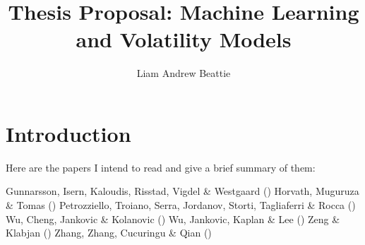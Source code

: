 \documentclass[11pt,preprint]{elsarticle}
\numberwithin{equation}{section}
\numberwithin{figure}{section}
\numberwithin{table}{section}
\begin{document}
\begin{frontmatter}  %

\title{Thesis Proposal: Machine Learning and Volatility Models}





\author[Add1]{Liam Andrew Beattie}





\address[Add1]{Stellenbosch University, South Africa}



\vspace{1cm}





\vspace{0.5cm}

\end{frontmatter}

\setcounter{footnote}{0}



\pagestyle{fancy}
\chead{}
\rhead{}
\lfoot{}
\lhead{}
\cfoot{}


\headsep 35pt %




\section{\texorpdfstring{Introduction
\label{Introduction}}{Introduction }}\label{introduction}

Here are the papers I intend to read and give a brief summary of them:

Gunnarsson, Isern, Kaloudis, Risstad, Vigdel \& Westgaard
() Horvath, Muguruza \&
Tomas () Petrozziello, Troiano,
Serra, Jordanov, Storti, Tagliaferri \& Rocca
() Wu, Cheng, Jankovic \&
Kolanovic () Wu, Jankovic, Kaplan
\& Lee () Zeng \& Klabjan
() Zhang, Zhang, Cucuringu \& Qian
()
\end{document}
